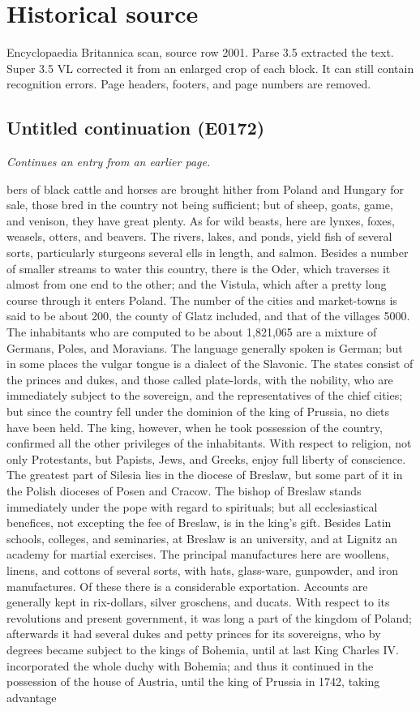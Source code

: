 \documentclass{article}
\begin{document}
\section*{Historical source}
Encyclopaedia Britannica scan, source row 2001. Parse 3.5 extracted the text. Super 3.5 VL corrected it from an enlarged crop of each block. It can still contain recognition errors.
Page headers, footers, and page numbers are removed.

\subsection*{Untitled continuation (E0172)}
\textit{Continues an entry from an earlier page.}

bers of black cattle and horses are brought hither from Poland and Hungary for sale, those bred in the country not being sufficient; but of sheep, goats, game, and venison, they have great plenty. As for wild beasts, here are lynxes, foxes, weasels, otters, and beavers. The rivers, lakes, and ponds, yield fish of several sorts, particularly sturgeons several ells in length, and salmon. Besides a number of smaller streams to water this country, there is the Oder, which traverses it almost from one end to the other; and the Vistula, which after a pretty long course through it enters Poland. The number of the cities and market-towns is said to be about 200, the county of Glatz included, and that of the villages 5000. The inhabitants who are computed to be about 1,821,065 are a mixture of Germans, Poles, and Moravians. The language generally spoken is German; but in some places the vulgar tongue is a dialect of the Slavonic. The states consist of the princes and dukes, and those called plate-lords, with the nobility, who are immediately subject to the sovereign, and the representatives of the chief cities; but since the country fell under the dominion of the king of Prussia, no diets have been held. The king, however, when he took possession of the country, confirmed all the other privileges of the inhabitants. With respect to religion, not only Protestants, but Papists, Jews, and Greeks, enjoy full liberty of conscience. The greatest part of Silesia lies in the diocese of Breslaw, but some part of it in the Polish dioceses of Posen and Cracow. The bishop of Breslaw stands immediately under the pope with regard to spirituals; but all ecclesiastical benefices, not excepting the fee of Breslaw, is in the king's gift. Besides Latin schools, colleges, and seminaries, at Breslaw is an university, and at Lignitz an academy for martial exercises. The principal manufactures here are woollens, linens, and cottons of several sorts, with hats, glass-ware, gunpowder, and iron manufactures. Of these there is a considerable exportation. Accounts are generally kept in rix-dollars, silver groschens, and ducats. With respect to its revolutions and present government, it was long a part of the kingdom of Poland; afterwards it had several dukes and petty princes for its sovereigns, who by degrees became subject to the kings of Bohemia, until at last King Charles IV. incorporated the whole duchy with Bohemia; and thus it continued in the possession of the house of Austria, until the king of Prussia in 1742, taking advantage 
\end{document}
